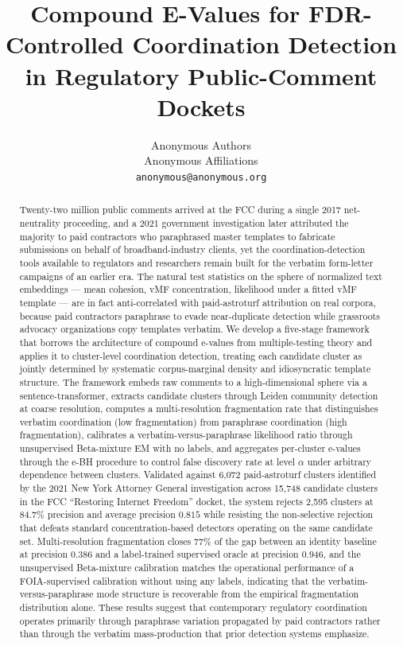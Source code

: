 \documentclass{article}
\title{Compound E-Values for FDR-Controlled Coordination Detection \\
in Regulatory Public-Comment Dockets}
\author{Anonymous Authors\\
Anonymous Affiliations\\
\texttt{anonymous@anonymous.org}
}
\theoremstyle{definition}
\theoremstyle{remark}
\begin{document}
\maketitle

\begin{abstract}
Twenty-two million public comments arrived at the FCC during a single 2017 net-neutrality proceeding, and a 2021 government investigation later attributed the majority to paid contractors who paraphrased master templates to fabricate submissions on behalf of broadband-industry clients, yet the coordination-detection tools available to regulators and researchers remain built for the verbatim form-letter campaigns of an earlier era. The natural test statistics on the sphere of normalized text embeddings --- mean cohesion, vMF concentration, likelihood under a fitted vMF template --- are in fact anti-correlated with paid-astroturf attribution on real corpora, because paid contractors paraphrase to evade near-duplicate detection while grassroots advocacy organizations copy templates verbatim. We develop a five-stage framework that borrows the architecture of compound e-values from multiple-testing theory and applies it to cluster-level coordination detection, treating each candidate cluster as jointly determined by systematic corpus-marginal density and idiosyncratic template structure. The framework embeds raw comments to a high-dimensional sphere via a sentence-transformer, extracts candidate clusters through Leiden community detection at coarse resolution, computes a multi-resolution fragmentation rate that distinguishes verbatim coordination (low fragmentation) from paraphrase coordination (high fragmentation), calibrates a verbatim-versus-paraphrase likelihood ratio through unsupervised Beta-mixture EM with no labels, and aggregates per-cluster e-values through the e-BH procedure to control false discovery rate at level $\alpha$ under arbitrary dependence between clusters. Validated against 6{,}072 paid-astroturf clusters identified by the 2021 New York Attorney General investigation across 15{,}748 candidate clusters in the FCC ``Restoring Internet Freedom'' docket, the system rejects 2{,}595 clusters at 84.7\% precision and average precision $0.815$ while resisting the non-selective rejection that defeats standard concentration-based detectors operating on the same candidate set. Multi-resolution fragmentation closes $77\%$ of the gap between an identity baseline at precision $0.386$ and a label-trained supervised oracle at precision $0.946$, and the unsupervised Beta-mixture calibration matches the operational performance of a FOIA-supervised calibration without using any labels, indicating that the verbatim-versus-paraphrase mode structure is recoverable from the empirical fragmentation distribution alone. These results suggest that contemporary regulatory coordination operates primarily through paraphrase variation propagated by paid contractors rather than through the verbatim mass-production that prior detection systems emphasize.
\end{abstract}
\end{document}

